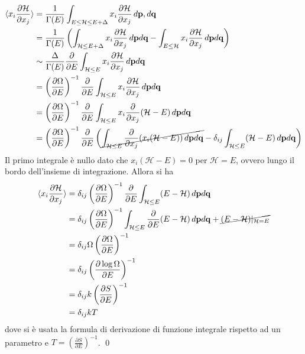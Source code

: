 \documentclass{article}
\begin{document}
\begin{align}
    \braket{x_i\frac{\partial \mathcal{H}}{\partial x_j}} &= \frac{1}{\Gamma(E)}\int_{E \leq \mathcal{H} \leq E + \Delta} x_i\frac{\partial \mathcal{H}}{\partial x_j} \, d\mathbf{p}, d\mathbf{q} \notag \\
    &= \frac{1}{\Gamma(E)}\left(\int_{\mathcal{H} \leq E + \Delta}x_i\frac{\partial \mathcal{H}}{\partial x_j} \, d\mathbf{p}d\mathbf{q} - \int_{E \leq \mathcal{H}}x_i\frac{\partial \mathcal{H}}{\partial x_j} \, d\mathbf{p}d\mathbf{q}\right) \notag \\
    &\sim \frac{\Delta}{\Gamma(E)}\frac{\partial}{\partial E}\int_{\mathcal{H} \leq E}x_i\frac{\partial \mathcal{H}}{\partial x_j} \, d\mathbf{p}d\mathbf{q} \notag \\
    &= \left(\frac{\partial \Omega}{\partial E}\right)^{-1}\frac{\partial}{\partial E}\int_{\mathcal{H} \leq E}x_i\frac{\partial \mathcal{H}}{\partial x_j} \, d\mathbf{p}d\mathbf{q} \notag \\
    &= \left(\frac{\partial \Omega}{\partial E}\right)^{-1}\frac{\partial}{\partial E}\int_{\mathcal{H} \leq E}x_i\frac{\partial}{\partial x_j}(\mathcal{H} - E) \, d\mathbf{p}d\mathbf{q} \notag \\
    &= \left(\frac{\partial \Omega}{\partial E}\right)^{-1}\frac{\partial}{\partial E}\left(\cancel{\int_{\mathcal{H} \leq E}\frac{\partial}{\partial x_j}(x_i(\mathcal{H} - E)) \, d\mathbf{p}d\mathbf{q}} - \delta_{ij}\int_{\mathcal{H} \leq E}(\mathcal{H} - E) \, d\mathbf{p}d\mathbf{q}\right) \notag
\end{align}
Il primo integrale è nullo dato che $x_i(\mathcal{H} - E) = 0$ per $\mathcal{H} = E$, ovvero lungo il bordo dell'insieme di integrazione. Allora si ha 
\begin{align}
    \braket{x_i\frac{\partial \mathcal{H}}{\partial x_j}} &= \delta_{ij}\left(\frac{\partial \Omega}{\partial E}\right)^{-1}\frac{\partial}{\partial E}\int_{\mathcal{H} \leq E}(E - \mathcal{H}) \, d\mathbf{p}d\mathbf{q} \notag \\
    &= \delta_{ij}\left(\frac{\partial\Omega}{\partial E}\right)^{-1}\int_{\mathcal{H} \leq E}\frac{\partial}{\partial E}(E - \mathcal{H}) \, d\mathbf{p}d\mathbf{q} + \cancel{(E - \mathcal{H})|_{\mathcal{H} = E}} \notag \\
    &= \delta_{ij}\Omega\left(\frac{\partial \Omega}{\partial E}\right)^{-1} \notag \\
    &= \delta_{ij}\left(\frac{\partial \log\Omega}{\partial E}\right)^{-1} \notag \\
    &= \delta_{ij}k\left(\frac{\partial S}{\partial E}\right)^{-1} \notag \\
    &= \delta_{ij}kT \notag
\end{align}
dove si è usata la formula di derivazione di funzione integrale rispetto ad un parametro e $T = \left(\frac{\partial S}{\partial E}\right)^{-1}$. \qed
\end{document}
